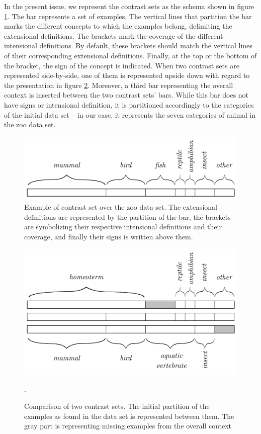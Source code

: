 In the present issue, we represent the contrast sets as the schema shown in figure \ref{normalcset}. The bar represents a set of examples. The vertical lines that partition the bar marks the different concepts to which the examples belong, delimiting the extensional definitions. The brackets mark the coverage of the different intensional definitions. By default, these brackets should match the vertical lines of their corresponding extensional definitions. Finally, at the top or the bottom of the bracket, the sign of the concept is indicated. When two contrast sets are represented side-by-side, one of them is represented upside down with regard to the presentation in figure \ref{csetcomparison}. Moreover, a third bar representing the overall context is inserted between the two contrast sets' bars. While this bar does not have signs or intensional definition, it is partitioned accordingly to the categories of the initial data set -- in our case, it represents the seven categories of animal in the zoo data set.

\begin{figure}[t]
\centering
\includegraphics[scale = 0.3]{figs/baceCset.pdf}
\caption{\label{normalcset} Example of contrast set over the zoo data set. The extensional definitions are represented by the partition of the bar, the brackets are symbolizing their respective intensional definitions and their coverage, and finally their signs is written above them.}
\end{figure}

\begin{figure}[t]
\centering
\includegraphics[scale = 0.3]{figs/exampleCsets.pdf}
\caption{\label{csetcomparison} Comparison of two contrast sets. The initial partition of the examples as found in the data set is represented between them. The gray part is representing missing examples from the overall context}.
\end{figure}

